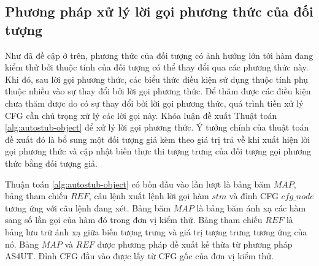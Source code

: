 \subsection{Phương pháp xử lý lời gọi phương thức của đối tượng} \label{sec:autostub-obj}
Như đã đề cập ở trên, phương thức của đối tượng có ảnh hưởng lớn tới hàm đang kiểm thử bởi thuộc tính của đối tượng có thể thay đổi qua các phương thức này. Khi đó, sau lời gọi phương thức, các biểu thức điều kiện sử dụng thuộc tính phụ thuộc nhiều vào sự thay đổi bởi lời gọi phương thức. Để thăm được các điều kiện chưa thăm được do có sự thay đổi bởi lời gọi phương thức, quá trình tiền xử lý CFG cần chú trọng xử lý các lời gọi này. Khóa luận đề xuất Thuật toán \ref{alg:autostub-object} để xử lý lời gọi phương thức. Ý tưởng chính của thuật toán đề xuất đó là bổ sung một đối tượng giả kèm theo giá trị trả về khi xuất hiện lời gọi phương thức và cập nhật biến thực thi tượng trưng của đối tượng gọi phương thức bằng đối tượng giả. 

Thuận toán \ref{alg:autostub-object} có bốn đầu vào lần lượt là bảng băm $MAP$, bảng tham chiếu $REF$, câu lệnh xuất lệnh lời gọi hàm $stm$ và đỉnh CFG $cfg\_node$ tương ứng với câu lệnh đang xét. Bảng băm $MAP$ là bảng băm ánh xạ các hàm sang số lần gọi của hàm đó trong đơn vị kiểm thử. Bảng tham chiếu $REF$ là bảng lưu trữ ánh xạ giữa biến tượng trưng và giá trị tượng trưng tương ứng của nó. Bảng $MAP$ và $REF$ được phương pháp đề xuất kế thừa từ phương pháp AS4UT. Đỉnh CFG đầu vào được lấy từ CFG gốc của đơn vị kiểm thử. 


